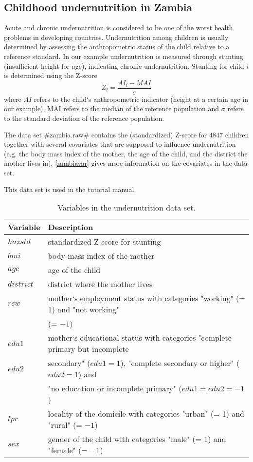 \subsection{Childhood undernutrition in Zambia}
\label{zambia}  

Acute and chronic undernutrition is considered to be one of the
worst health problems in developing countries. Undernutrition
among children is usually determined by assessing the
anthropometric status of the child relative to a reference
standard. In our example undernutrition is measured through
stunting (insufficient height for age), indicating chronic
undernutrition. Stunting for child $i$ is determined using the
Z-score
\[Z_i = \frac{AI_i-MAI}{\sigma}\]
where $AI$ refers to the child`s anthropometric indicator (height
at a certain age in our example), MAI refers to the median of the
reference population and $\sigma$ refers to the standard deviation
of the reference population.

The data set #zambia.raw# contains the (standardized) Z-score for
4847 children together with several covariates that are supposed
to influence undernutrition (e.g. the body mass index of the
mother, the age of the child, and the district the mother lives
in). \autoref{zambiavar} gives more information on the covariates
in the data set.

This data set is used in the tutorial manual.

\begin{table}[|h|t|]
\begin{center}
\begin{tabular}{|l|l|}
 \hline
 {\bf Variable} & {\bf Description}\\
 \hline
 $hazstd$ & standardized Z-score for stunting\\
 $bmi$ & body mass index of the mother\\
 $agc$ & age of the child\\
 $district$ & district where the mother lives\\
 $rcw$ & mother`s employment status with categories "working" (= 1) and "not working" \\
 & (= $-1$)\\
 $edu1$ & mother`s educational status with categories "complete primary but incomplete\\
 $edu2$ & secondary" ($edu1=1$), "complete secondary or higher" ($edu2=1$) and\\
 & "no education or incomplete primary" ($edu1=edu2=-1$)\\
 $tpr$ & locality of the domicile with categories "urban" (= 1) and "rural" (= $-1$)\\
 $sex$ & gender of the child with categories "male" (= 1) and
 "female" (= $-1$)\\
 \hline
\end{tabular}
{\em\caption{Variables in the undernutrition data set.
\label{zambiavar}}}
\end{center}
\end{table}
